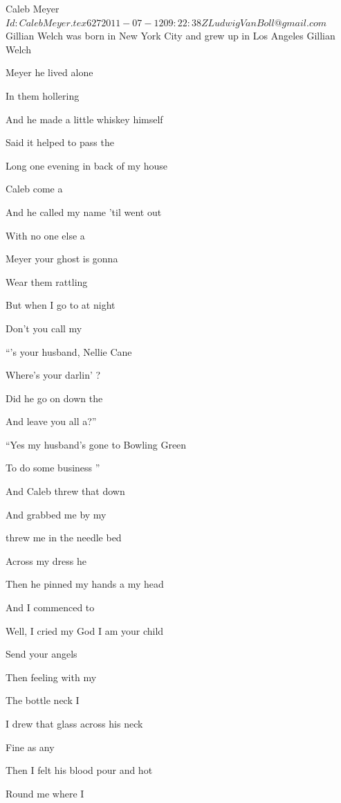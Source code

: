 \begin{SBSong}{Caleb Meyer}
  {$Id: CalebMeyer.tex 627 2011-07-12 09:22:38Z LudwigVanBoll@gmail.com $}
  {Gillian Welch was born in New York City and grew up in Los Angeles}
  {Gillian Welch}
  \begin{SBVerse}
	 Meyer he lived alone
	
	In them hollering 
	
	And he made a little whiskey  himself
	
	Said it helped to pass the 

	Long one evening in back of my house
	
	Caleb come a
	
	And he called my name 'til  went out
	
	With no one else a
  \end{SBVerse}
  \begin{SBChorus}
	 Meyer your ghost is gonna
	
	Wear them rattling 
	
	But when I go to  at night
	
	Don't you call my 
  \end{SBChorus}
  \begin{SBVerse}
	``'s your husband, Nellie Cane
	
	Where's your darlin' ?
	
	Did he go on down the 
	
	And leave you all a?''

	``Yes my husband's gone to Bowling Green
	
	To do some business ''
	
	And Caleb threw that  down
	
	And grabbed me by my 
  \end{SBVerse}
  \CBPageBrk
  \begin{SBVerse}
	 threw me in the needle bed
	
	Across my dress he 
	
	Then he pinned my hands a my head
	
	And I commenced to 

	Well, I cried my God I am your child
	
	Send your angels 
	
	Then feeling with my 
	
	The bottle neck I 

	I drew that glass across his neck
	
	Fine as any 
	
	Then I felt his blood pour  and hot
	
	Round me where I 
  \end{SBVerse}
\end{SBSong}
